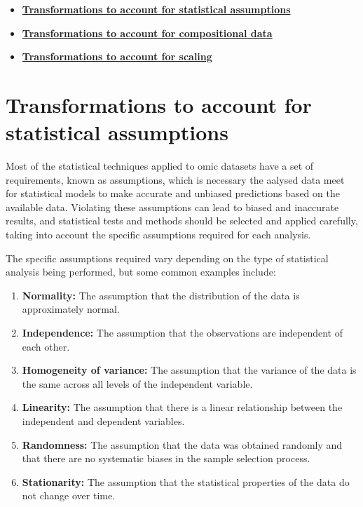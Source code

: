 \documentclass[
]{book}
\providecommand{\tightlist}{%
  \setlength{\itemsep}{0pt}\setlength{\parskip}{0pt}}
\begin{document}
\begin{itemize}
\tightlist
\item
  \textbf{\protect\hyperlink{data-transformation-assumptions}{Transformations to account for statistical assumptions}}
\item
  \textbf{\protect\hyperlink{data-transformation-assumptions}{Transformations to account for compositional data}}
\item
  \textbf{\protect\hyperlink{data-transformation-scaling}{Transformations to account for scaling}}
\end{itemize}

\hypertarget{data-transformation-assumptions}{%
\section{Transformations to account for statistical assumptions}\label{data-transformation-assumptions}}

Most of the statistical techniques applied to omic datasets have a set of requirements, known as assumptions, which is necessary the aalysed data meet for statistical models to make accurate and unbiased predictions based on the available data. Violating these assumptions can lead to biased and inaccurate results, and statistical tests and methods should be selected and applied carefully, taking into account the specific assumptions required for each analysis.

The specific assumptions required vary depending on the type of statistical analysis being performed, but some common examples include:

\begin{enumerate}
\def\labelenumi{\arabic{enumi}.}
\tightlist
\item
  \textbf{Normality:} The assumption that the distribution of the data is approximately normal.
\item
  \textbf{Independence:} The assumption that the observations are independent of each other.
\item
  \textbf{Homogeneity of variance:} The assumption that the variance of the data is the same across all levels of the independent variable.
\item
  \textbf{Linearity:} The assumption that there is a linear relationship between the independent and dependent variables.
\item
  \textbf{Randomness:} The assumption that the data was obtained randomly and that there are no systematic biases in the sample selection process.
\item
  \textbf{Stationarity:} The assumption that the statistical properties of the data do not change over time.
\end{enumerate}
\end{document}
